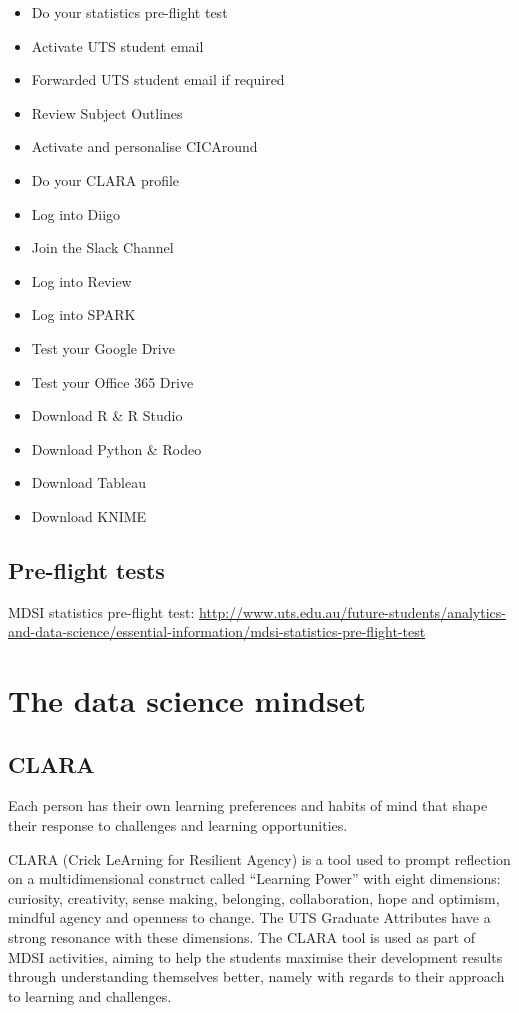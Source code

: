 \documentclass[]{book}
\providecommand{\tightlist}{%
  \setlength{\itemsep}{0pt}\setlength{\parskip}{0pt}}
\theoremstyle{definition}
\theoremstyle{definition}
\theoremstyle{remark}
\begin{document}
\begin{itemize}
\tightlist
\item
  Do your statistics pre-flight test
\item
  Activate UTS student email
\item
  Forwarded UTS student email if required
\item
  Review Subject Outlines
\item
  Activate and personalise CICAround
\item
  Do your CLARA profile
\item
  Log into Diigo
\item
  Join the Slack Channel
\item
  Log into Review
\item
  Log into SPARK
\item
  Test your Google Drive
\item
  Test your Office 365 Drive
\item
  Download R \& R Studio
\item
  Download Python \& Rodeo
\item
  Download Tableau
\item
  Download KNIME
\end{itemize}

\section{Pre-flight tests}\label{pre-flight-tests}

MDSI statistics pre-flight test:
\url{http://www.uts.edu.au/future-students/analytics-and-data-science/essential-information/mdsi-statistics-pre-flight-test}

\chapter{The data science mindset}\label{the-data-science-mindset}

\section{CLARA}\label{clara}

Each person has their own learning preferences and habits of mind that
shape their response to challenges and learning opportunities.

CLARA (Crick LeArning for Resilient Agency) is a tool used to prompt
reflection on a multidimensional construct called ``Learning Power''
with eight dimensions: curiosity, creativity, sense making, belonging,
collaboration, hope and optimism, mindful agency and openness to change.
The UTS Graduate Attributes have a strong resonance with these
dimensions. The CLARA tool is used as part of MDSI activities, aiming to
help the students maximise their development results through
understanding themselves better, namely with regards to their approach
to learning and challenges.
\end{document}
